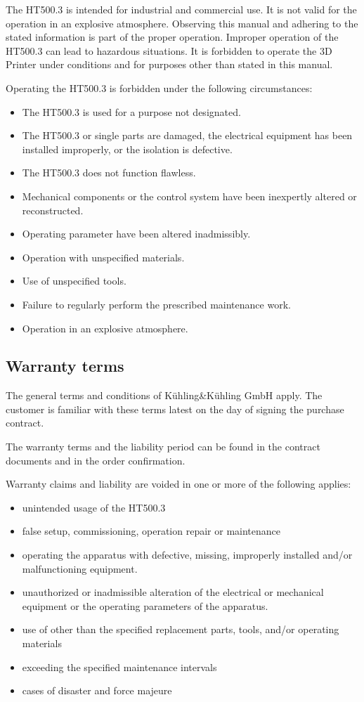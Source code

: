 The HT500.3 is intended for industrial and commercial use. It is not valid for the operation in an explosive atmosphere.
Observing this manual and adhering to the stated information is part of the proper operation.
Improper operation of the HT500.3 can lead to hazardous situations.
It is forbidden to operate the 3D Printer under conditions and for purposes other than stated in this manual.

Operating the HT500.3 is forbidden under the following circumstances: 

\begin{itemize}
  \item The HT500.3 is used for a purpose not designated.
  \item The HT500.3 or single parts are damaged, the electrical equipment has been installed improperly, or the isolation is defective.
  \item The HT500.3 does not function flawless.
  \item Mechanical components or the control system have been inexpertly altered or reconstructed.
  \item Operating parameter have been altered inadmissibly.
  \item Operation with unspecified materials.
  \item Use of unspecified tools.
  \item Failure to regularly perform the prescribed maintenance work.
  \item Operation in an explosive atmosphere.
\end{itemize}



\subsection{Warranty terms}

The general terms and conditions of Kühling\&Kühling GmbH apply. The customer is familiar with these terms latest on the day of signing the purchase contract.

The warranty terms and the liability period can be found in the contract documents and in the order confirmation.

Warranty claims and liability are voided in one or more of the following applies:

\begin{itemize}
  \item unintended usage of the HT500.3
  \item false setup, commissioning, operation repair or maintenance
  \item operating the apparatus with defective, missing, improperly installed and/or malfunctioning equipment.
  \item unauthorized or inadmissible alteration of the electrical or mechanical equipment or the operating parameters of the apparatus.
  \item use of other than the specified replacement parts, tools, and/or operating materials
  \item exceeding the specified maintenance intervals
  \item cases of disaster and force majeure
\end{itemize}

